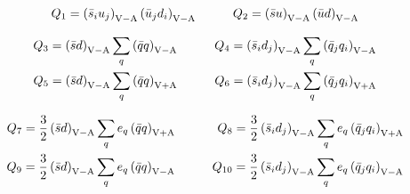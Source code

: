 
\begin{eqnarray}
Q_{1} = \left( \bar s_{i} u_{j}  \right)_{\rm V-A}
            \left( \bar u_{j}  d_{i} \right)_{\rm V-A}
&\qquad&
Q_{2} = \left( \bar s u \right)_{\rm V-A}
            \left( \bar u d \right)_{\rm V-A}
\label{eq:Q12}
\end{eqnarray}


\begin{eqnarray}
Q_{3} = \left( \bar s d \right)_{\rm V-A}
   \sum_{q} \left( \bar q q \right)_{\rm V-A}
&\qquad&
Q_{4} = \left( \bar s_{i} d_{j}  \right)_{\rm V-A}
   \sum_{q} \left( \bar q_{j}  q_{i} \right)_{\rm V-A}
\label{eq:Q34} \\
Q_{5} = \left( \bar s d \right)_{\rm V-A}
   \sum_{q} \left( \bar q q \right)_{\rm V+A}
&\qquad&
Q_{6} = \left( \bar s_{i} d_{j}  \right)_{\rm V-A}
   \sum_{q} \left( \bar q_{j}  q_{i} \right)_{\rm V+A}
\label{eq:Q56}
\end{eqnarray}


\begin{eqnarray}
Q_{7} = \frac{3}{2} \left( \bar s d \right)_{\rm V-A}
         \sum_{q} e_{q} \left( \bar q q \right)_{\rm V+A}
&\qquad&
Q_{8} = \frac{3}{2} \left( \bar s_{i} d_{j} \right)_{\rm V-A}
         \sum_{q} e_{q} \left( \bar q_{j}  q_{i}\right)_{\rm V+A}
\label{eq:Q78} \\
Q_{9} = \frac{3}{2} \left( \bar s d \right)_{\rm V-A}
         \sum_{q} e_{q} \left( \bar q q \right)_{\rm V-A}
&\qquad&
Q_{10} = \frac{3}{2} \left( \bar s_{i} d_{j} \right)_{\rm V-A}
         \sum_{q} e_{q} \left( \bar q_{j}  q_{i}\right)_{\rm V-A}
\label{eq:Q910}
\end{eqnarray}

